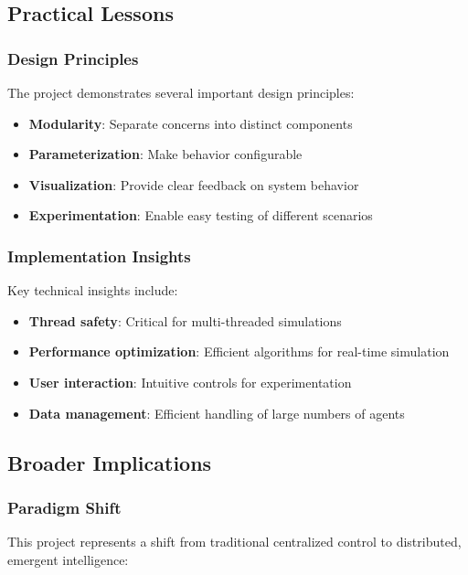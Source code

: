 \documentclass[12pt,a4paper]{article}
\begin{document}
\subsection{Practical Lessons}

\subsubsection{Design Principles}
The project demonstrates several important design principles:

\begin{itemize}
    \item \textbf{Modularity}: Separate concerns into distinct components
    \item \textbf{Parameterization}: Make behavior configurable
    \item \textbf{Visualization}: Provide clear feedback on system behavior
    \item \textbf{Experimentation}: Enable easy testing of different scenarios
\end{itemize}

\subsubsection{Implementation Insights}
Key technical insights include:

\begin{itemize}
    \item \textbf{Thread safety}: Critical for multi-threaded simulations
    \item \textbf{Performance optimization}: Efficient algorithms for real-time simulation
    \item \textbf{User interaction}: Intuitive controls for experimentation
    \item \textbf{Data management}: Efficient handling of large numbers of agents
\end{itemize}

\subsection{Broader Implications}

\subsubsection{Paradigm Shift}
This project represents a shift from traditional centralized control to distributed, emergent intelligence:
\end{document}
